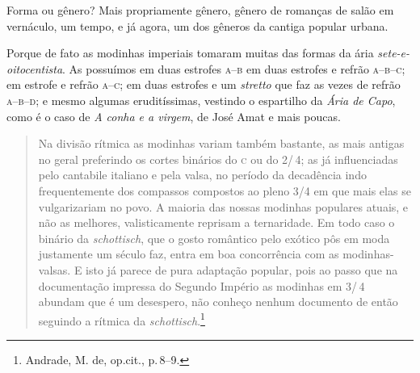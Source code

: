 Forma ou gênero? Mais propriamente gênero, gênero de romanças de salão
em vernáculo, um tempo, e já agora, um dos gêneros da cantiga popular
urbana.

Porque de fato as modinhas imperiais tomaram muitas das formas da ária
\textit{sete-e-oitocentista}. As possuímos em duas estrofes \textsc{a}--\textsc{b} em duas
estrofes e refrão \textsc{a}--\textsc{b}--\textsc{c}; em estrofe e refrão \textsc{a}--\textsc{c}; em duas estrofes e um \textit{stretto} que faz as vezes de refrão \textsc{a}--\textsc{b}--\textsc{d}; e mesmo algumas eruditíssimas, vestindo o espartilho da \textit{Ária de Capo}, como é o
caso de \textit{A conha e a virgem}, de José Amat e mais poucas.

\begin{quote}
\small{Na divisão rítmica as modinhas variam também bastante, as mais antigas
no geral preferindo os cortes binários do \textsc{c} ou do 2/\,4; as já
influenciadas pelo cantabile italiano e pela valsa, no período da
decadência indo frequentemente dos compassos compostos ao pleno 3/4 em
que mais elas se vulgarizariam no povo. A maioria das nossas modinhas
populares atuais, e não as melhores, valisticamente reprisam a
ternaridade. Em todo caso o binário da \textit{schottisch}, que o gosto romântico
pelo exótico pôs em moda justamente um século faz, entra em boa
concorrência com as modinhas-valsas. E isto já parece de pura adaptação
popular, pois ao passo que na documentação impressa do Segundo Império
as modinhas em 3/\,4 abundam que é um desespero, não conheço nenhum
documento de então seguindo a rítmica da \textit{schottisch}.}\footnote{Andrade, M. de,
op.cit., p.\,8--9.}
\end{quote}


